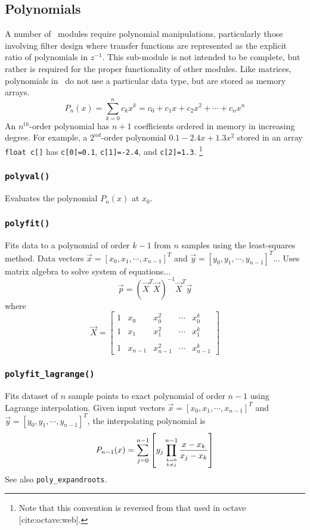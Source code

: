 \subsection{Polynomials}
A number of \liquid\ modules require polynomial manipulations, particularly
those involving filter design where transfer functions are represented as the
explicit ratio of polynomials in $z^{-1}$.
This sub-module is not intended to be complete, but rather is required for
the proper functionality of other modules.
Like matrices, polynomials in \liquid\ do not use a particular data type, but
are stored as memory arrays.
\[
    P_n(x) = \sum_{k=0}^{n}{c_k x^k}
           = c_0 + c_1 x + c_2 x^2 + \cdots + c_n x^n
\]
An $n^{th}$-order polynomial has $n+1$ coefficients ordered in memory in
increasing degree.
For example, a $2^{nd}$-order polynomial $0.1 -2.4x + 1.3x^2$ stored in an
array {\tt float c[]} has
{\tt c[0]=0.1},
{\tt c[1]=-2.4}, and
{\tt c[2]=1.3}.%
\footnote{Note that this convention is reversed from that used in octave
[cite:octave:web].}

\subsubsection{{\tt polyval()}}
Evaluates the polynomial $P_n(x)$ at $x_0$.

\subsubsection{{\tt polyfit()}}
Fits data to a polynomial of order $k-1$ from $n$ samples using the
least-squares method.
Data vectors
$\vec{x}=[x_0,x_1,\cdots,x_{n-1}]^T$ and 
$\vec{y}=[y_0,y_1,\cdots,y_{n-1}]^T$...
Uses matrix algebra to solve system of equations...
\[
    \vec{p} = \left(\vec{X}^T\vec{X}\right)^{-1}\vec{X}^T\vec{y}
\]
where
\[
    \vec{X} = 
    \begin{bmatrix}
        1   & x_0       & x_0^2     & \cdots    & x_0^{k}     \\
        1   & x_1       & x_1^2     & \cdots    & x_1^{k}     \\
        \\
        1   & x_{n-1}   & x_{n-1}^2 & \cdots    & x_{n-1}^{k}
    \end{bmatrix}
\]


\subsubsection{{\tt polyfit\_lagrange()}}
Fits dataset of $n$ sample points to exact polynomial of order $n-1$ using
Lagrange interpolation.
Given input vectors
$\vec{x}=[x_0,x_1,\cdots,x_{n-1}]^T$ and 
$\vec{y}=[y_0,y_1,\cdots,y_{n-1}]^T$, the interpolating polynomial is
\[
    P_{n-1}(x) =
        \sum_{j=0}^{n-1} {
            \left[
            y_j
            \prod_{{k=0}\atop{k \ne j}}^{n-1} {
                \frac{x-x_k}{x_j-x_k}
            }
            \right]
        }
\]
See also {\tt poly\_expandroots}.

